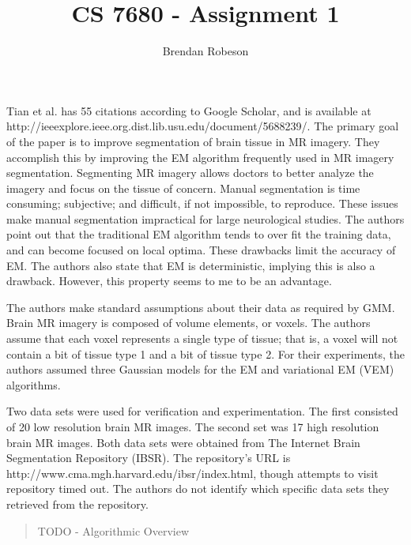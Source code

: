 \documentclass[11pt]{article}
\begin{document}
\title{CS 7680 - Assignment 1}
\author{Brendan Robeson}
\maketitle

Tian et al. \cite{5688239} has 55 citations according to Google Scholar, and is
available at \\ http://ieeexplore.ieee.org.dist.lib.usu.edu/document/5688239/.
The primary goal of the paper is to improve segmentation of brain tissue in MR
imagery. They accomplish this by improving the EM algorithm frequently used in
MR imagery segmentation. Segmenting MR imagery allows doctors to better analyze
the imagery and focus on the tissue of concern. Manual segmentation is time
consuming; subjective; and difficult, if not impossible, to reproduce. These
issues make manual segmentation impractical for large neurological studies. The
authors point out that the traditional EM algorithm tends to over fit the
training data, and can become focused on local optima. These drawbacks limit the
accuracy of EM. The authors also state that EM is deterministic, implying this
is also a drawback. However, this property seems to me to be an advantage.

The authors make standard assumptions about their data as required by GMM. Brain
MR imagery is composed of volume elements, or voxels. The authors assume that
each voxel represents a single type of tissue; that is, a voxel will not contain
a bit of tissue type 1 and a bit of tissue type 2. For their experiments, the
authors assumed three Gaussian models for the EM and variational EM (VEM)
algorithms.

Two data sets were used for verification and experimentation. The first
consisted of 20 low resolution brain MR images. The second set was 17 high
resolution brain MR images. Both data sets were obtained from The Internet Brain
Segmentation Repository (IBSR). The repository's URL is
http://www.cma.mgh.harvard.edu/ibsr/index.html, though attempts to visit
repository timed out. The authors do not identify which specific data sets they
retrieved from the repository.

\begin{quote}TODO - Algorithmic Overview\end{quote}
\end{document}
